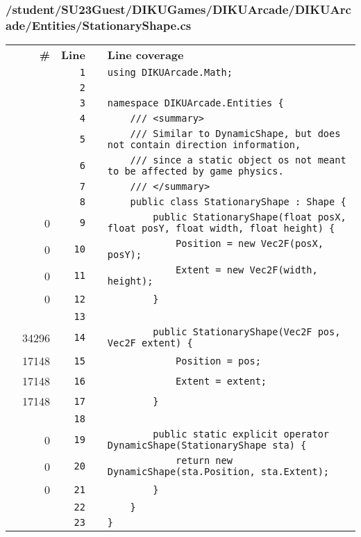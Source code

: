 \documentclass[a4paper,landscape,10pt]{article}
\begin{document}
\subsubsection{/student/SU23Guest/DIKUGames/DIKUArcade/DIKUArcade/Entities/StationaryShape.cs}
\begin{longtable}[l]{lrrll}
\textbf{} & \textbf{\#} & \textbf{Line} & \textbf{} & \textbf{Line coverage}\\
\cellcolor{gray} &  & \verb~1~ & & \verb~using DIKUArcade.Math;~\\
\cellcolor{gray} &  & \verb~2~ & & \verb~~\\
\cellcolor{gray} &  & \verb~3~ & & \verb~namespace DIKUArcade.Entities {~\\
\cellcolor{gray} &  & \verb~4~ & & \verb~    /// <summary>~\\
\cellcolor{gray} &  & \verb~5~ & & \verb~    /// Similar to DynamicShape, but does not contain direction information,~\\
\cellcolor{gray} &  & \verb~6~ & & \verb~    /// since a static object os not meant to be affected by game physics.~\\
\cellcolor{gray} &  & \verb~7~ & & \verb~    /// </summary>~\\
\cellcolor{gray} &  & \verb~8~ & & \verb~    public class StationaryShape : Shape {~\\
\cellcolor{red} & 0 & \verb~9~ & & \verb~        public StationaryShape(float posX, float posY, float width, float height) {~\\
\cellcolor{red} & 0 & \verb~10~ & & \verb~            Position = new Vec2F(posX, posY);~\\
\cellcolor{red} & 0 & \verb~11~ & & \verb~            Extent = new Vec2F(width, height);~\\
\cellcolor{red} & 0 & \verb~12~ & & \verb~        }~\\
\cellcolor{gray} &  & \verb~13~ & & \verb~~\\
\cellcolor{green} & 34296 & \verb~14~ & & \verb~        public StationaryShape(Vec2F pos, Vec2F extent) {~\\
\cellcolor{green} & 17148 & \verb~15~ & & \verb~            Position = pos;~\\
\cellcolor{green} & 17148 & \verb~16~ & & \verb~            Extent = extent;~\\
\cellcolor{green} & 17148 & \verb~17~ & & \verb~        }~\\
\cellcolor{gray} &  & \verb~18~ & & \verb~~\\
\cellcolor{red} & 0 & \verb~19~ & & \verb~        public static explicit operator DynamicShape(StationaryShape sta) {~\\
\cellcolor{red} & 0 & \verb~20~ & & \verb~            return new DynamicShape(sta.Position, sta.Extent);~\\
\cellcolor{red} & 0 & \verb~21~ & & \verb~        }~\\
\cellcolor{gray} &  & \verb~22~ & & \verb~    }~\\
\cellcolor{gray} &  & \verb~23~ & & \verb~}~\\
\end{longtable}
\newpage
\end{document}
